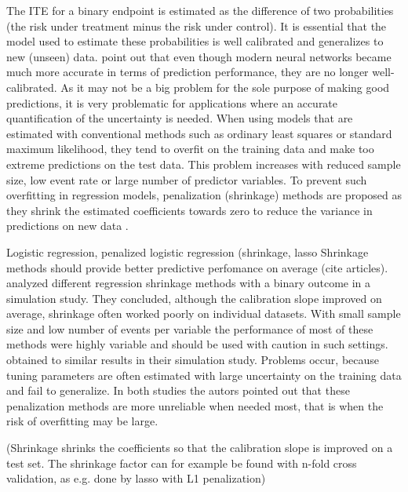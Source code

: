 The ITE for a binary endpoint is estimated as the difference of two probabilities (the risk under treatment minus the risk under control). It is essential that the model used to estimate these probabilities is well calibrated and generalizes to new (unseen) data. \citep{guo2017} point out that even though modern neural networks became much more accurate in terms of prediction performance, they are no longer well-calibrated. As it may not be a big problem for the sole purpose of making good predictions, it is very problematic for applications where an accurate quantification of the uncertainty is needed. When using models that are estimated with conventional methods such as ordinary least squares or standard maximum likelihood, they tend to overfit on the training data and make too extreme predictions on the test data. This problem increases with reduced sample size, low event rate or large number of predictor variables. To prevent such overfitting in regression models, penalization (shrinkage) methods are proposed as they shrink the estimated coefficients towards zero to reduce the variance in predictions on new data \citep{riley2021}. 




Logistic regression, penalized logistic regression (shrinkage, lasso
Shrinkage methods should provide better predictive perfomance on average (cite articles). \citet{calster2020} analyzed different regression shrinkage methods with a binary outcome in a simulation study. They concluded, although the calibration slope improved on average, shrinkage often worked poorly on individual datasets. With small sample size and low number of events per variable the performance of most of these methods were highly variable and should be used with caution in such settings. \citet{riley2021} obtained to similar results in their simulation study. Problems occur, because tuning parameters are often estimated with large uncertainty on the training data and fail to generalize. In both studies the autors pointed out that these penalization methods are more unreliable when needed most, that is when the risk of overfitting may be large.


(Shrinkage shrinks the coefficients so that the calibration slope is improved on a test set. The shrinkage factor can for example be found with n-fold cross validation, as e.g. done by lasso with L1 penalization)

